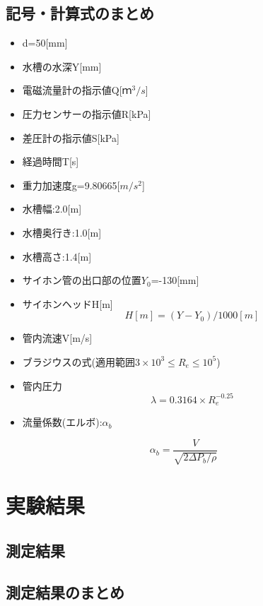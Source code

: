 \documentclass[a4j,twoside,openright,11pt]{jarticle}
\begin{document}
\subsection{記号・計算式のまとめ}
\begin{itemize}
\item d=50[mm]
\item 水槽の水深Y[mm]
\item 電磁流量計の指示値Q[$ｍ^3/s$]
\item 圧力センサーの指示値R[kPa]
\item 差圧計の指示値S[kPa]
\item 経過時間T[s]
\item 重力加速度g=9.80665[$m/s^2$]
\item 水槽幅:2.0[m]
\item 水槽奥行き:1.0[m]
\item 水槽高さ:1.4[m]
\item サイホン管の出口部の位置$Y_0$=-130[mm]
\item サイホンヘッドH[m]\\
\begin{equation}
H[m]=(Y-Y_0)/1000[m]
\end{equation}
\item 管内流速V[m/s]
\item ブラジウスの式(適用範囲$3 \times 10^3 \leq R_e \leq10^5$)\\
\item 管内圧力
\begin{equation}
\lambda=0.3164 \times R_e^{-0.25}
\end{equation}
\item 流量係数(エルボ):$\alpha_b$
\end{itemize}
\begin{equation}
\alpha_b=\frac{V}{ \sqrt{2 \Delta P_b / \rho }}
\end{equation}
\section{実験結果}
\subsection{測定結果}
\newpage
\subsection{測定結果のまとめ}
\end{document}
